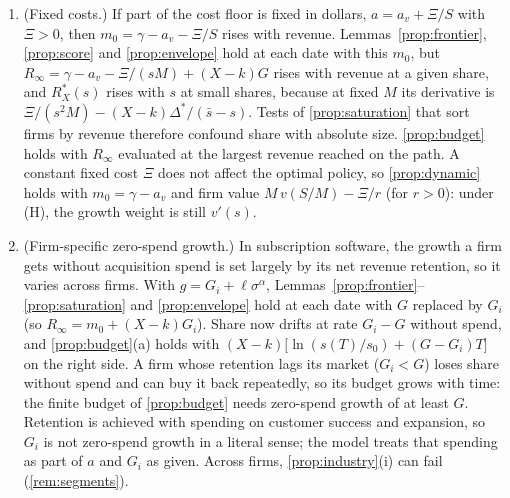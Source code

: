 \begin{remark}\label{rem:assumptions}
\begin{enumerate}
\item[(a)] (Fixed costs.) If part of the cost floor is fixed in dollars, $a=a_v+\Xi/S$ with $\Xi>0$, then $m_0=\gamma-a_v-\Xi/S$ rises with revenue. Lemmas~\ref{prop:frontier}, \ref{prop:score} and \ref{prop:envelope} hold at each date with this $m_0$, but $R_\infty=\gamma-a_v-\Xi/(sM)+(X-k)G$ rises with revenue at a given share, and $R_X^*(s)$ rises with $s$ at small shares, because at fixed $M$ its derivative is $\Xi/(s^2M)-(X-k)\Delta^*/(\bar s-s)$. Tests of \autoref{prop:saturation} that sort firms by revenue therefore confound share with absolute size. \autoref{prop:budget} holds with $R_\infty$ evaluated at the largest revenue reached on the path. A constant fixed cost $\Xi$ does not affect the optimal policy, so \autoref{prop:dynamic} holds with $m_0=\gamma-a_v$ and firm value $M\,v(S/M)-\Xi/r$ (for $r>0$): under (H), the growth weight is still $v'(s)$.
\item[(b)] (Firm-specific zero-spend growth.) In subscription software, the growth a firm gets without acquisition spend is set largely by its net revenue retention, so it varies across firms. With $g=G_i+\ell\sigma^{\alpha}$, Lemmas~\ref{prop:frontier}--\ref{prop:saturation} and \ref{prop:envelope} hold at each date with $G$ replaced by $G_i$ (so $R_\infty=m_0+(X-k)G_i$). Share now drifts at rate $G_i-G$ without spend, and \autoref{prop:budget}(a) holds with $(X-k)\bigl[\ln(s(T)/s_0)+(G-G_i)T\bigr]$ on the right side. A firm whose retention lags its market ($G_i<G$) loses share without spend and can buy it back repeatedly, so its budget grows with time: the finite budget of \autoref{prop:budget} needs zero-spend growth of at least $G$. Retention is achieved with spending on customer success and expansion, so $G_i$ is not zero-spend growth in a literal sense; the model treats that spending as part of $a$ and $G_i$ as given. Across firms, \autoref{prop:industry}(i) can fail (\autoref{rem:segments}).

\end{enumerate}
\end{remark}

